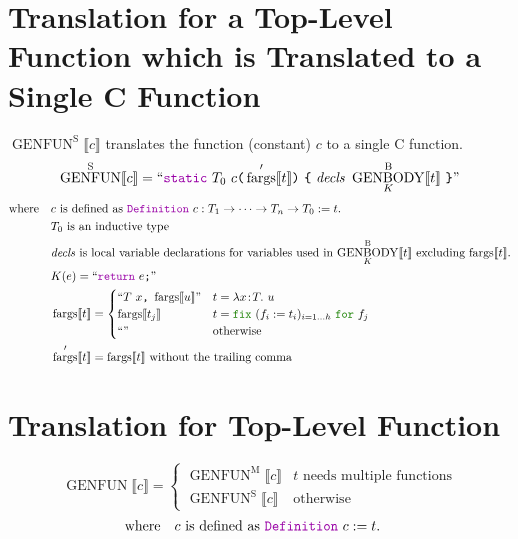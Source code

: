 \documentclass[a4paper,fleqn]{article}
\newcommand{\kwDefinition}{\mbox{\color{myviolet}\ttfamily Definition}}
\newcommand{\kwfix}{\mbox{\color{mygreen}\ttfamily fix}}
\newcommand{\kwfor}{\mbox{\color{mygreen}\ttfamily for}}
\newcommand{\lamT}[3]{\lambda #1\!:\!#2.~#3}
\newcommand{\fix}[4]{\kwfix~(#1 := #2)_{#3}~\kwfor~#4}
\newcommand{\BRA}[1]{\llbracket #1 \rrbracket}
\DeclareMathOperator{\genbody}{GENBODY}
\newcommand{\genbodyb}[2]{\genbody^\mathrm{B}_{#1}\BRA{#2}}
\DeclareMathOperator{\genfunop}{GENFUN}
\newcommand{\genfun}[1]{\genfunop\BRA{#1}}
\newcommand{\genfuns}[1]{\genfunop^\mathrm{S}\BRA{#1}}
\newcommand{\genfunm}[1]{\genfunop^\mathrm{M}\BRA{#1}}
\newcommand{\dq}[1]{\text{``}#1\text{''}}
\newcommand{\ttparen}[1]{\texttt{(}#1\texttt{)}}
\newcommand{\ttbrace}[1]{\texttt{\{}#1\texttt{\}}}
\newcommand{\ttsemi}{\texttt{;}}
\newcommand{\ttcomma}{\texttt{,}}
\newcommand{\kwCreturn}{\mbox{\color{myviolet}\ttfamily return}}
\newcommand{\kwstatic}{\mbox{\color{myviolet}\ttfamily static}}
\DeclareMathOperator{\fargsop}{fargs}
\newcommand{\fargs}[1]{\fargsop\BRA{#1}}
\newcommand{\fargsd}[1]{\fargsop'\BRA{#1}}
\begin{document}
\section{Translation for a Top-Level Function which is Translated to a Single C Function}\label{sec:genfuns}
\raggedright
$\genfuns{c}$ translates the function (constant) $c$ to a single C function.
\[
  \genfuns{c} = \dq{\kwstatic~T_0~c\ttparen{\fargsd{t}}~\ttbrace{~\mathit{decls}~\genbodyb{K}{t}~}}
\]
\[ \text{where} \quad
  \begin{aligned}[t]
    & \text{$c$ is defined as \kwDefinition~$c : T_1 \rightarrow \dots \rightarrow T_n \rightarrow T_0 := t.$} \\
    & \text{$T_0$ is an inductive type} \\
    & \text{$\mathit{decls}$ is local variable declarations for variables used in $\genbodyb{K}{t}$ excluding $\fargs{t}$.} \\
    & K(e) = \dq{\kwCreturn~e\ttsemi} \\
    & \fargs{t} =
      \begin{cases}
        \dq{T~x\ttcomma~\fargs{u}}      & t = \lamT{x}{T}{u} \\
        \fargs{t_j}       & t = \fix{f_i}{t_i}{i=1\dots h}{f_j} \\
        \dq{}    & \text{otherwise}
      \end{cases} \\
    & \fargsd{t} = \fargs{t}~\text{without the trailing comma}
  \end{aligned}
\]

\section{Translation for Top-Level Function}\label{sec:genfun}
\raggedright
\[
  \genfun{c} =
  \begin{cases}
    \genfunm{c} & \text{$t$ needs multiple functions} \\
    \genfuns{c} & \text{otherwise}
  \end{cases}
\]
\[ \text{where} \quad
  \begin{aligned}[t]
    & \text{$c$ is defined as \kwDefinition~$c := t.$}
  \end{aligned}
\]



\end{document}
